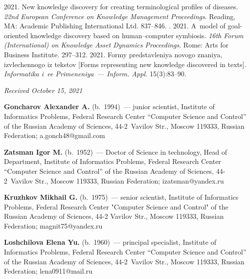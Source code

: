 \begin{multicols}{2}
{{\begin{thebibliography}{99}
 2021. New knowledge discovery for creating 
terminological profiles of diseases. \textit{22nd European Conference on Knowledge 
Management Proceedings}. Reading, MA: Academic Publishing International Ltd. 837--846.
. 2021. A~model of goal-oriented knowledge discovery based on 
human--computer symbiosis. \textit{16th Forum (International) on Knowledge Asset Dynamics 
Proceedings}. Rome: Arts for Business Institute.
 297--312.
 2021. Formy predstavleniya novogo znaniya, izvlechennogo iz tekstov 
[Forms representing new knowledge discovered in texts]. \textit{Informatika i~ee 
Primeneniya~--- Inform. Appl.} 15(3):83--90.
\end{thebibliography}

 }
 }

\end{multicols}

\vspace*{-3pt}

\hfill{\small\textit{Received October 15, 2021}}





\Contr

\noindent
\textbf{Goncharov Alexander A.} (b.\ 1994)~--- junior scientist, Institute of Informatics Problems, 
Federal Research Center ``Computer Science and Control'' of the Russian Academy of Sciences, 
44-2~Vavilov Str., Moscow 119333, Russian Federation; \mbox{a.gonch48@gmail.com}

\vspace*{3pt}

\noindent
\textbf{Zatsman Igor M.} (b.\ 1952)~--- Doctor of Science in technology, Head of Department, 
Institute of Informatics Problems, Federal Research Center ``Computer Science and Control'' of 
the Russian Academy of Sciences, 44-2~Vavilov Str., Moscow 119333, Russian Federation; 
\mbox{izatsman@yandex.ru}

\vspace*{3pt}

\noindent
\textbf{Kruzhkov Mikhail G.} (b.\ 1975)~--- senior scientist, Institute of Informatics Problems, 
Federal Research Center "Computer Science and Control" of the Russian Academy of Sciences, 
44-2 Vavilov Str., Moscow 119333, Russian Federation; \mbox{magnit75@yandex.ru}

\vspace*{3pt}

\noindent
\textbf{Loshchilova Elena Yu.} (b.\ 1960)~--- principal specialist, Institute of Informatics Problems, 
Federal Research Center ``Computer Science and Control'' of the Russian Academy of Sciences, 
44-2~Vavilov Str., Moscow 119333, Russian Federation; \mbox{lena0911@mail.ru}


\label{end\stat}

\renewcommand{\bibname}{\protect\rm Литература} 